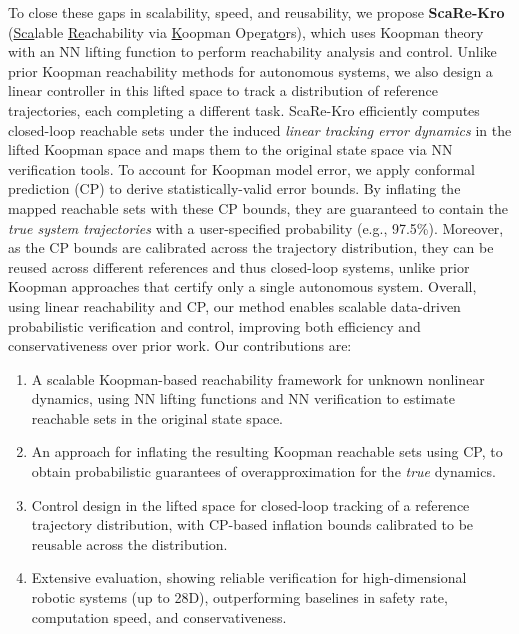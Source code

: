 To close these gaps in scalability, speed, and reusability, we propose \textbf{ScaRe-Kro} (\underline{Sca}lable \underline{Re}achability via \underline{K}oopman Ope\underline{r}at\underline{o}rs), which uses Koopman theory with an NN lifting function to perform reachability analysis and control. Unlike prior Koopman reachability methods for autonomous systems, we also design a linear controller in this lifted space to track a distribution of reference trajectories, each completing a different task. ScaRe-Kro efficiently computes closed-loop reachable sets under the induced \textit{linear tracking error dynamics} in the lifted Koopman space and maps them to the original state space via NN verification tools. To account for Koopman model error, we apply conformal prediction (CP) to derive statistically-valid error bounds. By inflating the mapped reachable sets with these CP bounds, they are guaranteed to contain the \textit{true system trajectories} with a user-specified probability (e.g., 97.5\%). Moreover, as the CP bounds are calibrated across the trajectory distribution, they can be reused across different references and thus closed-loop systems, unlike prior Koopman approaches that certify only a single autonomous system. Overall, using linear reachability and CP, our method enables scalable data-driven probabilistic verification and control, improving both efficiency and conservativeness over prior work. Our contributions are:

\begin{enumerate}
  \setlength{\itemsep}{0pt}
  \setlength{\parskip}{0pt}
  \setlength{\parsep}{0pt}
  \setlength{\topsep}{0pt}
  \setlength{\partopsep}{0pt}
  \item A scalable Koopman-based reachability framework for unknown nonlinear dynamics, using NN lifting functions and NN verification to estimate reachable sets in the original state space.
  \item An approach for inflating the resulting Koopman reachable sets using CP, to obtain probabilistic guarantees of overapproximation for the \textit{true} dynamics.
  \item Control design in the lifted space for closed-loop tracking of a reference trajectory distribution, with CP-based inflation bounds calibrated to be reusable across the distribution.
  \item Extensive evaluation, showing reliable verification for high-dimensional robotic systems (up to 28D), outperforming baselines in safety rate, computation speed, and conservativeness.
\end{enumerate}
